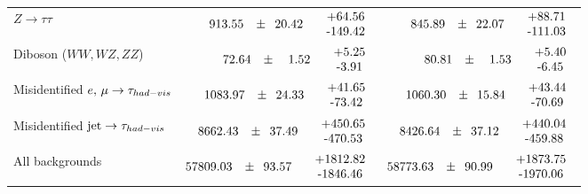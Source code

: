 \begin{table}
\begin{center}
{\begin{tabular}{l|r|r}
			\hspace*{5mm}$Z \to \tau\tau$  & $\phantom{00}913.55\phantom{.0}\pm\phantom{0}20.42\phantom{.0}\phantom{0}\begin{tabular}{c}+64.56 \\-149.42\end{tabular}$  & $\phantom{00}845.89\phantom{.0}\pm\phantom{0}22.07\phantom{.0}\phantom{0}\begin{tabular}{c}+88.71 \\-111.03\end{tabular}$ \\ \cline{2-3}
			\hspace*{5mm}Diboson ($WW, WZ, ZZ$) &  $\phantom{000}72.64\phantom{.0}\pm\phantom{00}1.52\phantom{.0}\phantom{0}\begin{tabular}{c}+5.25 \\-3.91\end{tabular}$ & $\phantom{000}80.81\phantom{.0}\pm\phantom{00}1.53\phantom{.0}\phantom{0}\begin{tabular}{c}+5.40 \\-6.45\end{tabular}$ \\ \cline{2-3}
			Misidentified $e,\,\mu \to \tau_{had-vis}$   &   $\phantom{0}1083.97\phantom{.0}\pm\phantom{0}24.33\phantom{.0}\phantom{0}\begin{tabular}{c}+41.65 \\-73.42\end{tabular}$ & $\phantom{0}1060.30\phantom{.0}\pm\phantom{0}15.84\phantom{.0}\phantom{0}\begin{tabular}{c}+43.44 \\-70.69\end{tabular}$ \\ \cline{2-3}
			Misidentified $\mbox{jet} \to \tau_{had-vis}$ &   $\phantom{0}8662.43\phantom{.0}\pm\phantom{0}37.49\phantom{.0}\phantom{0}\begin{tabular}{c}+450.65 \\-470.53\end{tabular}$ & $\phantom{0}8426.64\phantom{.0}\pm\phantom{0}37.12\phantom{.0}\phantom{0}\begin{tabular}{c}+440.04 \\-459.88\end{tabular}$ \\ \cline{2-3}
			\hline
			All backgrounds   &  $57809.03\phantom{.0}\pm\phantom{0} 93.57\phantom{.0}\phantom{0}\begin{tabular}{c}+1812.82 \\-1846.46\end{tabular}$ & $58773.63\phantom{.0}\pm\phantom{0} 90.99\phantom{.0}\phantom{0}\begin{tabular}{c}+1873.75 \\-1970.06\end{tabular}$ \\

\end{tabular}}
\end{center}
\end{table}
